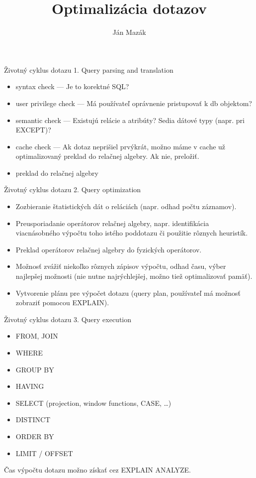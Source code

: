 \documentclass[12pt]{beamer}
\title{Optimalizácia dotazov}
\author{Ján Mazák}
\institute{FMFI UK Bratislava}
\date{}
\begin{document}
\frame{\titlepage}

\begin{frame}[fragile]{Životný cyklus dotazu}
1. Query parsing and translation
\begin{itemize}
  \item syntax check --- Je to korektné SQL?
  \item user privilege check --- Má používateľ oprávnenie pristupovať k db objektom?
  \item semantic check --- Existujú relácie a atribúty? Sedia dátové typy (napr. pri EXCEPT)?
  \item cache check --- Ak dotaz neprišiel prvýkrát,
      možno máme v cache už optimalizovaný preklad do relačnej algebry. Ak nie, preložiť.
  \item preklad do relačnej algebry
\end{itemize}
\end{frame}

\begin{frame}[fragile]{Životný cyklus dotazu}
2. Query optimization
\begin{itemize}
  \item Zozbieranie štatistických dát o reláciách (napr. odhad počtu záznamov).
  \item Preusporiadanie operátorov relačnej algebry,
      napr. identifikácia viacnásobného výpočtu toho istého poddotazu či použitie rôznych heuristík.
  \item Preklad operátorov relačnej algebry do fyzických operátorov.
  \item Možnosť zvážiť niekoľko rôznych zápisov výpočtu, odhad času, výber najlepšej možnosti
      (nie nutne najrýchlejšej, možno tiež optimalizovať pamäť).
  \item Vytvorenie plánu pre výpočet dotazu (query plan, používateľ má možnosť zobraziť pomocou EXPLAIN).
\end{itemize}
\end{frame}

\begin{frame}[fragile]{Životný cyklus dotazu}
3. Query execution
\begin{itemize}
  \item FROM, JOIN
  \item WHERE
  \item GROUP BY
  \item HAVING
  \item SELECT (projection, window functions, CASE, \dots)
  \item DISTINCT
  \item ORDER BY
  \item LIMIT / OFFSET
\end{itemize}
Čas výpočtu dotazu možno získať cez EXPLAIN ANALYZE.
\end{frame}
\end{document}
